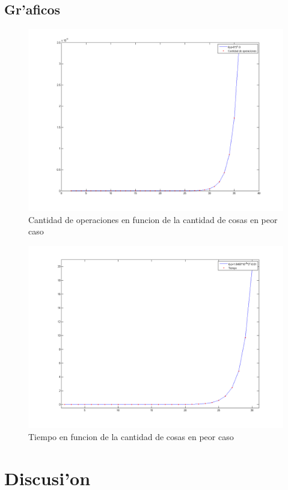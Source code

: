 \subsection{Gr'aficos}

\begin{figure}[H]
\centering
\includegraphics[scale=0.5]{../../codigo/ejercicio2/benchmark/graficos/operaciones_peor_caso/cantOperacionesPeorCaso.png}
\caption{Cantidad de operaciones en funcion de la cantidad de cosas en peor caso}
\end{figure}

\begin{figure}[H]
\centering
\includegraphics[scale=0.5]{../../codigo/ejercicio2/benchmark_tiempos/graficos/tiempo_peor_caso/tiempobacktracking.png}
\caption{Tiempo en funcion de la cantidad de cosas en peor caso}
\end{figure}

\section{Discusi'on}


	
